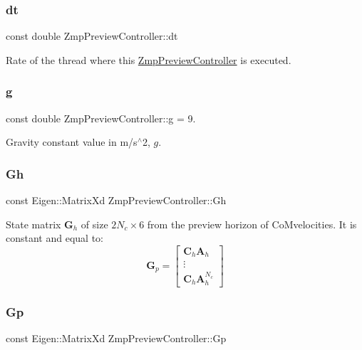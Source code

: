 \subsubsection{\texorpdfstring{dt}{dt}}
{\footnotesize\ttfamily const double Zmp\+Preview\+Controller\+::dt\hspace{0.3cm}{\ttfamily [private]}}

Rate of the thread where this \hyperlink{classZmpPreviewController}{Zmp\+Preview\+Controller} is executed. \hypertarget{classZmpPreviewController_a344571f012aa58250d7625905681bf1b}{}\label{classZmpPreviewController_a344571f012aa58250d7625905681bf1b} 
\subsubsection{\texorpdfstring{g}{g}}
{\footnotesize\ttfamily const double Zmp\+Preview\+Controller\+::g = 9.\hspace{0.3cm}{\ttfamily [private]}}

Gravity constant value in m/s$^\wedge$2, $ g $. \hypertarget{classZmpPreviewController_a9429cb06fdd2c3ca5036a2fd48303632}{}\label{classZmpPreviewController_a9429cb06fdd2c3ca5036a2fd48303632} 
\subsubsection{\texorpdfstring{Gh}{Gh}}
{\footnotesize\ttfamily const Eigen\+::\+Matrix\+Xd Zmp\+Preview\+Controller\+::\+Gh\hspace{0.3cm}{\ttfamily [private]}}

State matrix $\mathbf{G}_h$ of size $2N_c \times 6$ from the preview horizon of Co\+Mvelocities. It is constant and equal to\+: \[ \mathbf{G}_p = \left[\begin{array}{c} \mathbf{C}_h\mathbf{A}_h \\ \vdots \\ \mathbf{C}_h\mathbf{A}^{N_c}_h \end{array}\right] \] \hypertarget{classZmpPreviewController_a53a7d8af5be4a5d5cea99fad2ea48979}{}\label{classZmpPreviewController_a53a7d8af5be4a5d5cea99fad2ea48979} 
\subsubsection{\texorpdfstring{Gp}{Gp}}
{\footnotesize\ttfamily const Eigen\+::\+Matrix\+Xd Zmp\+Preview\+Controller\+::\+Gp\hspace{0.3cm}{\ttfamily [private]}}

